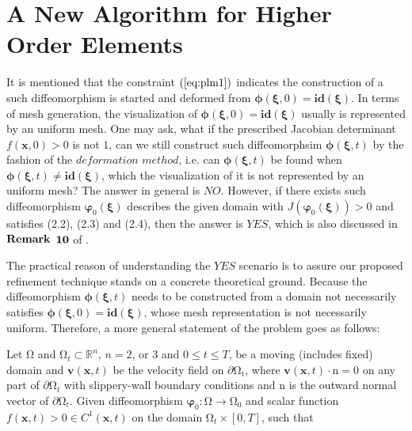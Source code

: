 \documentclass{article}
\theoremstyle{definition}
\theoremstyle{remark}
\numberwithin{equation}{section}
\numberwithin{subsection}{section}
\begin{document}
\section{A New Algorithm for Higher Order Elements}
It is mentioned that the constraint $(\ref{eq:plm1})$ indicates the construction of a such diffeomorphism is started and deformed from $\pmb{\phi}(\pmb{\xi},0)=\pmb{id}(\pmb{\xi})$. In terms of mesh generation, the visualization of $\pmb{\phi}(\pmb{\xi},0)=\pmb{id}(\pmb{\xi})$ usually is represented by an uniform mesh. One may ask, what if the prescribed Jacobian determinant $f(\pmb{x},0)>0$ is not $1$, can we still construct such diffeomorphsim $\pmb{\phi}(\pmb{\xi},t)$ by the fashion of the $deformation$ $method$, i.e. can $\pmb{\phi}(\pmb{\xi},t)$ be found when $\pmb{\phi}(\pmb{\xi},t)\neq\pmb{id}(\pmb{\xi})$, which the visualization of it is not represented by an uniform mesh? The answer in general is $NO$. However, if there exists such diffeomorphism $\pmb{\varphi}_0(\pmb{\xi})$ describes the given domain with $J(\pmb{\varphi}_0(\pmb{\xi}))>0$ and satisfies (2.2), (2.3) and (2.4), then the answer is $YES$, which is also discussed in $\bf{Remark}$ $\bf{10}$ of \cite{XiChen}. 

The practical reason of understanding the $YES$ scenario is to assure our proposed refinement technique stands on a concrete theoretical ground. Because the diffeomorphism $\pmb{\phi}(\pmb{\xi},t)$ needs to be constructed from a domain not necessarily satisfies $\pmb{\phi}(\pmb{\xi},0)=\pmb{id}(\pmb{\xi})$, whose mesh representation is not necessarily uniform. Therefore, a more general statement of the problem goes as follows:

Let $\mathrm{\Omega}$ and $\mathrm{\Omega}_t \subset \mathbb R^n$, $n=2$, or $3$ and $0\leq{t}\leq{T}$, be a moving (includes fixed) domain and $\pmb{v}(\pmb{x},t)$ be the velocity field on $\partial\mathrm{\Omega_t}$, where $\pmb{v}(\pmb{x},t)\cdot{\pmb{\mathrm{n}}}=0$ on any part of $\partial\mathrm{\Omega}_t$ with slippery-wall boundary conditions and $\pmb{\mathrm{n}}$ is the outward normal vector of $\partial\mathrm{\Omega}_t$. Given diffeomorphism $\pmb{\varphi}_0:\mathrm{\Omega}\rightarrow\mathrm{\Omega}_0$ and scalar function $f(\pmb{x},t)>0 \in C^1(\pmb{x},t)$ on the domain $\mathrm{\Omega}_t \times [0,T]$, such that
\end{document}
